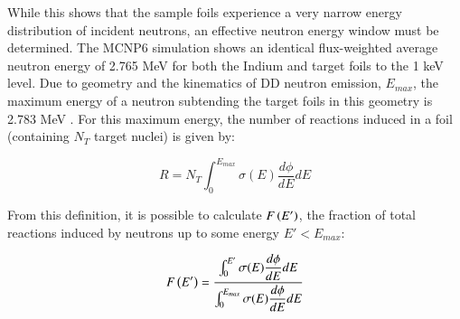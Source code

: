 
While this shows that the sample foils experience a very narrow energy distribution of incident neutrons, an effective neutron energy window must be determined.
The MCNP6 simulation shows an identical flux-weighted average neutron energy of 2.765 MeV for both the Indium and target foils to the 1 keV level.
Due to geometry and the kinematics of DD neutron emission, $E_{max}$,  the maximum energy of a neutron subtending the target foils in this geometry is 2.783 MeV \cite{Liskien_Paulsen_1973}.
For this maximum energy, the number of reactions induced in a foil (containing $N_T$ target nuclei) is given by:

\begin{equation}
R = N_T \int_0^{E_{max}} \sigma(E) \dfrac{d\phi}{dE} dE
\end{equation}



From this definition, it is possible to calculate $F\left( E'\right)$, the fraction of total reactions induced by neutrons up to some energy $E' < E_{max}$:

\begin{equation}\label{eqn:react_fraction}
F\pp{E'} = \dfrac{\int_0^{E'} \sigma(E) \dfrac{d\phi}{dE} dE}{\int_0^{E_{max}} \sigma(E) \dfrac{d\phi}{dE} dE}
\end{equation}




